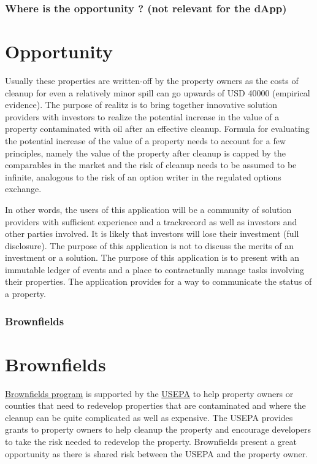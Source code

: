 \documentclass{beamer}
\begin{document}
\begin{frame}
\frametitle{Where is the opportunity ? (not relevant for the dApp)}

\section {Opportunity}

Usually these properties are written-off by the property owners as the costs of cleanup for even a relatively minor spill can go upwards of USD 40000 (empirical evidence). The purpose of realitz is to bring together innovative solution providers with investors to realize the potential increase in the value of a property contaminated with oil after an effective cleanup. Formula for evaluating the potential increase of the value of a property needs to account for a few principles, namely the value of the property after cleanup is capped by the comparables in the market and the risk of cleanup needs to be assumed to be infinite, analogous to the risk of an option writer in the regulated options exchange. 

In other words, the users of this application will be a community of solution providers with sufficient experience and a trackrecord as well as investors and other parties involved. It is likely that investors will lose their investment (full disclosure). The purpose of this application is not to discuss the merits of an investment or a solution. The purpose of this application is to present with an immutable ledger of events and a place to contractually manage tasks involving their properties. The application provides for a way to communicate the status of a property.

\end{frame}

\begin{frame}
\frametitle{Brownfields}
\section{Brownfields} \label{brownfields}
   \href{https://www.epa.gov/brownfields/overview-brownfields-program} {Brownfields program} is supported by the \href{https://www.epa.gov/} {USEPA} to help property owners or counties that need to redevelop properties that are contaminated and where the cleanup can be quite complicated as well as expensive. The USEPA provides grants to property owners to help cleanup the property and encourage developers to take the risk needed to redevelop the property. Brownfields present a great opportunity as there is shared risk between the USEPA and the property owner. 
\end{frame}
\end{document}
